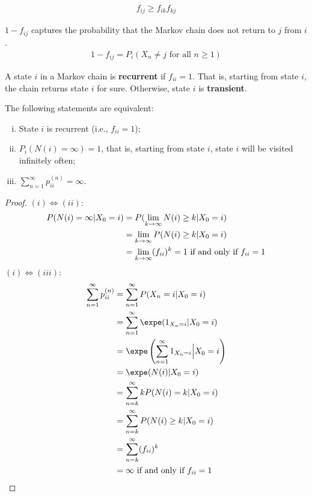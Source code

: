\documentclass{article}
\begin{document}
	\begin{corollary}
		\begin{align}
			f_{ij} \geq f_{ik}f_{kj}
		\end{align}
	\end{corollary}
    
    \begin{proposition}
    	$1-f_{i j}$ captures the probability that the Markov chain does not return to $j$ from $i$.
    	\begin{align}
    		1-f_{i j}=P_{i}\left(X_{n} \neq j \text { for all } n \geq 1\right)
    	\end{align}
    \end{proposition}
    
    \begin{definition}
    	A state $i$ in a Markov chain is \textbf{recurrent} if $f_{ii} = 1$. That is, starting from state $i$, the chain returns state $i$ for sure.
    	Otherwise, state $i$ is \textbf{transient}.
    \end{definition}
    
    \begin{theorem}
    	The following statements are equivalent:
    	\begin{enumerate}[(i)]
    		\item State $i$ is recurrent (i.e., $f_{ii}=1$);
    		\item $P_i(N(i) = \infty) = 1$, that is, starting from state $i$, state $i$ will be visited infinitely often;
    		\item $\sum_{n=1}^\infty p_{ii}^{(n)} = \infty$.
    	\end{enumerate}
    \end{theorem}

    \begin{proof}
    	$(i) \iff (ii)$:
    	\begin{align}
    		P(N(i) = \infty|X_0=i) &= P(\lim_{k \to \infty} N(i) \geq k| X_0=i) \\
    		&= \lim_{k \to \infty} P(N(i) \geq k| X_0=i) \\
    		&= \lim_{k \to \infty} (f_{ii})^k = 1 \text{{ if and only if }} f_{ii} = 1
    	\end{align}
    	$(i) \iff (iii)$:
    	\begin{align}
    		\sum_{n=1}^\infty p_{ii}^{(n)}
    		&= \sum_{n=1}^\infty P(X_n = i | X_0 = i) \\
    		&= \sum_{n=1}^\infty \expe (1_{X_n=i} | X_0 = i) \\
    		&= \expe \left(
    		\sum_{n=1}^\infty 1_{X_n=i} \Big| X_0 = i
    		\right ) \\
    		&= \expe (N(i) | X_0=i) \\
    		&= \sum_{n=k}^\infty k P(N(i)=k | X_0=i) \\
    		&= \sum_{n=k}^\infty P(N(i) \geq k | X_0=i) \\
    		&= \sum_{n=k}^\infty (f_{ii})^k \\
    		&= \infty \tx{ if and only if } f_{ii} = 1
    	\end{align}
    \end{proof}
 
\end{document}
